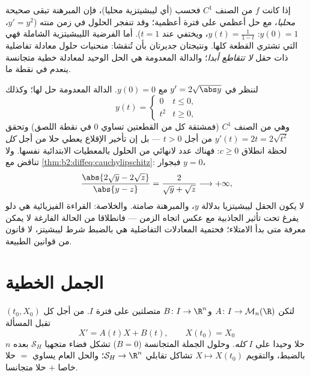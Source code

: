 \begin{remark}
إذا كانت $f$ من الصنف $C^1$ فحسب (أي ليبشيتزية محليا)، فإن
المبرهنة تبقى صحيحة \emph{محليا}، مع حل أعظمي على فترة  أعظمية؛
وقد تنفجر الحلول في زمن منته ($y' = y^2$، $y(0) = 1$: $y(t)
= \frac{1}{1-t}$، ويختفي عند
$t = 1$). أما الفرضية الليبشيتزية الشاملة فهي التي تشتري القطعة كلها.
ونتيجتان جديرتان بأن تُنقشا: منحنيات حلول معادلة تفاضلية ذات حقل
 \emph{لا تتقاطع أبدا}؛ والدالة المعدومة هي الحل الوحيد
لمعادلة خطية متجانسة ينعدم في نقطة ما.
\end{remark}

\begin{example}\label{ex:b2:diffeq:leaky}
لننظر في $y' = 2\sqrt{\abs y}$ مع $y(0) = 0$. الدالة المعدومة حل لها؛ وكذلك
\[
y(t) = \begin{cases} 0 & t \leq 0,\\ t^2 & t \geq 0,
\end{cases}
\]
وهي من الصنف $C^1$ (فمشتقة كل من القطعتين تساوي $0$ في نقطة
اللصق) وتحقق $y'(t) = 2t = 2\sqrt{t^2}$ من أجل $t > 0$ --- بل إن تأخير الإقلاع يعطي حلا من
أجل \emph{كل} لحظة انطلاق $c \geq 0$: فهناك عدد لانهائي من الحلول
بالمعطيات الابتدائية نفسها. ولا تناقض مع
\cref{thm:b2:diffeq:cauchylipschitz}: فبجوار $y = 0$،
\[
\frac{\abs{2\sqrt y - 2\sqrt z}}{\abs{y - z}}
= \frac{2}{\sqrt y + \sqrt z} \longrightarrow +\infty ,
\]
لا يكون الحقل ليبشيتزيا بدلالة $y$، والمبرهنة صامتة.
والخلاصة: القراءة الفيزيائية هي دلو يفرغ تحت تأثير الجاذبية مع عكس
اتجاه الزمن --- فانطلاقا من الحالة الفارغة لا يمكن معرفة متى بدأ
الامتلاء؛ فحتمية المعادلات التفاضلية هي بالضبط شرط ليبشيتز، لا قانون
من قوانين الطبيعة.
\end{example}

\section{الجمل الخطية}

\begin{theorem}\label{thm:b2:diffeq:linear}
لتكن $A \colon I \to \mathcal{M}_n(\R)$ و$B \colon I \to \R^n$ متصلتين على فترة $I$. من أجل كل $(t_0, X_0)$ تقبل
المسألة
\[
X' = A(t)X + B(t), \qquad X(t_0) = X_0
\]
حلا وحيدا على $I$ \emph{كله}. وحلول الجملة المتجانسة ($B = 0$) تشكل
فضاء متجهيا $\mathcal{S}_H$ بعده $n$ بالضبط، والتقويم $X \mapsto X(t_0)$ تشاكل تقابلي
$\mathcal{S}_H \to \R^n$؛ والحل العام يساوي $=$ حلا خاصا $+$ حلا متجانسا.
\end{theorem}

